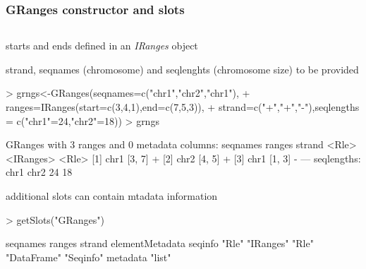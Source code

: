 \documentclass{beamer}
\begin{document}
\begin{frame}[fragile]
\frametitle{GRanges constructor and slots}
\begin{column}{1\textwidth}
  \bit
      \item starts and ends defined in an \emph{IRanges} object
      \item strand, seqnames (chromosome) and seqlenghts (chromosome size) to be provided
          \begin{uncoverenv}
\begin{Schunk}
\begin{Sinput}
> grngs<-GRanges(seqnames=c("chr1","chr2","chr1"), 
+       ranges=IRanges(start=c(3,4,1),end=c(7,5,3)),
+     strand=c("+","+","-"),seqlengths = c("chr1"=24,"chr2"=18))
> grngs
\end{Sinput}
\begin{Soutput}
GRanges with 3 ranges and 0 metadata columns:
      seqnames    ranges strand
         <Rle> <IRanges>  <Rle>
  [1]     chr1    [3, 7]      +
  [2]     chr2    [4, 5]      +
  [3]     chr1    [1, 3]      -
  ---
  seqlengths:
   chr1 chr2
     24   18
\end{Soutput}
\end{Schunk}
          \end{uncoverenv}   
      \item additional slots can contain mtadata information
          \begin{uncoverenv}
\begin{Schunk}
\begin{Sinput}
> getSlots("GRanges")
\end{Sinput}
\begin{Soutput}
       seqnames          ranges          strand elementMetadata         seqinfo 
          "Rle"       "IRanges"           "Rle"     "DataFrame"       "Seqinfo" 
       metadata 
         "list" 
\end{Soutput}
\end{Schunk}
          \end{uncoverenv}  
  \eit
\end{column}
\end{frame}

\end{document}
